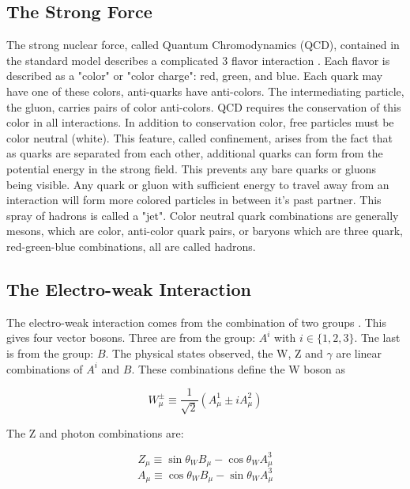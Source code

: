 \subsection{The Strong Force}
The strong nuclear force, called Quantum Chromodynamics (QCD), contained in the standard model describes a complicated 3 flavor interaction \SUthree. Each flavor is described as a "color" or "color charge": red, green, and blue. Each quark may have one of these colors, anti-quarks have anti-colors. The intermediating particle, the gluon, carries pairs of color anti-colors. QCD requires the conservation of this color in all interactions. In addition to conservation color, free particles must be color neutral (white). This feature, called confinement, arises from the fact that as quarks are separated from each other, additional quarks can form from the potential energy in the strong field. This prevents any bare quarks or gluons being visible. Any quark or gluon with sufficient energy to travel away from an interaction will form more colored particles in between it's past partner. This spray of hadrons is called a "jet". Color neutral quark combinations are generally mesons, which are color, anti-color quark pairs, or baryons which are three quark, red-green-blue combinations, all are called hadrons.

\subsection{The Electro-weak Interaction}
The electro-weak interaction comes from the combination of two groups \SUtwoUone . This gives four vector bosons.  Three are from the \SUtwoL group: \ensuremath{A^i} with \ensuremath{i\in\{1,2,3\}}.  Tne last is from the \Uone group: \ensuremath{B}. The physical states observed, the W, Z and \ensuremath{\gamma} are linear combinations of \ensuremath{A^i} and \ensuremath{B}. These combinations define the W boson as

\begin{equation}\label{eq:Wboson}
    W_{\mu}^{\pm}
    \equiv  
    \frac{1}{\sqrt{2}}
    \left(
    A_{\mu}^{1}
    \pm
    iA_{\mu}^{2}
    \right)
\end{equation}

The Z and photon combinations are:

\begin{equation}\label{eq:Z}
    Z_{\mu}
    \equiv  
    \sin{\theta_W}
    B_{\mu}
    -
    \cos{\theta_W}
    A_\mu^3
    \end{equation}
\begin{equation}\label{eq:photon}
     A_{\mu}
    \equiv  
    \cos{\theta_W}
    B_{\mu}
    -
    \sin{\theta_W}
    A_\mu^3
\end{equation}

